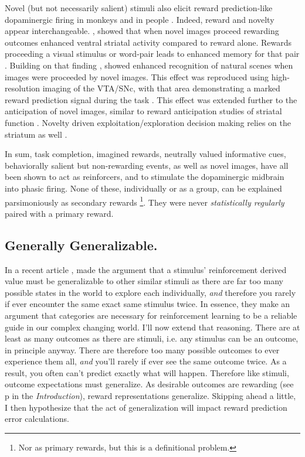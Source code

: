 \documentclass[doc,12pt]{apa}        %
\begin{document}
Novel (but not necessarily salient) stimuli also elicit reward prediction-like dopaminergic firing in monkeys \cite{Blatter:2006p6372} and in people \cite{Bunzeck:2006p5319}. Indeed, reward and novelty appear interchangeable.  , showed that when novel images proceed rewarding outcomes enhanced ventral striatal activity compared to reward alone.  Rewards proceeding a visual stimulus or word-pair leads to enhanced memory for that pair \cite{Lisman:2005p5455}.  Building on that finding , showed enhanced recognition of natural scenes when images were proceeded by novel images.  This effect was reproduced using high-resolution imaging of the VTA/SNc, with that area demonstrating a marked reward prediction signal during the task \cite{Krebs:2011p8134}.  This effect was extended further to the anticipation of novel images, similar to reward anticipation studies of striatal function \cite{Knutson:2001p5234}.  Novelty driven exploitation/exploration decision making relies on the striatum as well \cite{Wittmann:2008p541}.

In sum, task completion, imagined rewards, neutrally valued informative cues, behaviorally salient but non-rewarding events, as well as novel images, have all been shown to act as reinforcers, and to stimulate the dopaminergic midbrain into phasic firing.  None of these, individually or as a group, can be explained parsimoniously as secondary rewards
\footnote{
    Nor as primary rewards, but this is a definitional problem.
}.  They were never \emph{statistically regularly} paired with a primary reward.


\subsection{Generally Generalizable.}
\label{sub:gen}
In a recent article , made the argument that a stimulus' reinforcement derived value must be generalizable to other similar stimuli as there are far too many possible states in the world to explore each individually, \emph{and} therefore you rarely if ever encounter the same exact same stimulus twice.  In essence, they make an argument that categories are necessary for reinforcement learning to be a reliable guide in our complex changing world.  I'll now extend that reasoning.  There are at least as many outcomes as there are stimuli, i.e. any stimulus can be an outcome, in principle anyway. There are therefore too many possible outcomes to ever experience them all, \emph{and} you'll rarely if ever see the same outcome twice.  As a result, you often can't predict exactly what will happen. Therefore like stimuli, outcome expectations must generalize.  As desirable outcomes are rewarding (see p\pageref{sub:cogrew} in the \emph{Introduction}), reward representations generalize.  Skipping ahead a little, I then hypothesize that the act of generalization will impact reward prediction error calculations.
\end{document}
